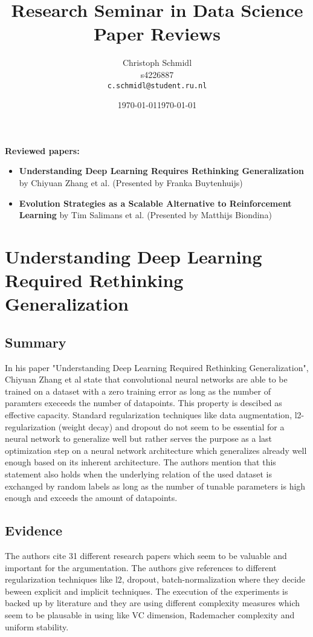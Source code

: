 \documentclass[a4paper]{article}
\title{Research Seminar in Data Science\\Paper Reviews}
\author{
  Christoph Schmidl\\ s4226887\\      \texttt{c.schmidl@student.ru.nl}
}
\date{\today}
\date{\today}
\begin{document}
\maketitle

\textbf{Reviewed papers:}

\begin{itemize}
	\item \textbf{Understanding Deep Learning Requires Rethinking Generalization} by Chiyuan Zhang et al. (Presented by Franka Buytenhuijs)
	\item \textbf{Evolution Strategies as a
Scalable Alternative to Reinforcement Learning} by Tim Salimans et al. (Presented by Matthijs Biondina)
\end{itemize}


\section{Understanding Deep Learning Required Rethinking Generalization}

\subsection{Summary}

In his paper "Understanding Deep Learning Required Rethinking Generalization", Chiyuan Zhang et al state that convolutional neural networks are able to be trained on a dataset with a zero training error as long as the number of paramters execeeds the number of datapoints. This property is descibed as effective capacity. Standard regularization techniques like data augmentation, l2-regularization (weight decay) and dropout do not seem to be essential for a neural network to generalize well but rather serves the purpose as a last optimization step on a neural network architecture which generalizes already well enough based on its inherent architecture. The authors mention that this statement also holds when the underlying relation of the used dataset is exchanged by random labels as long as the number of tunable parameters is high enough and exceeds the amount of datapoints.

\subsection{Evidence}

The authors cite 31 different research papers which seem to be valuable and important for the argumentation. The authors give references to different regularization techniques like l2, dropout, batch-normalization where they decide beween explicit and implicit techniques. The execution of the experiments is backed up by literature and they are using different complexity measures which seem to be plausable in using like VC dimension, Rademacher complexity and uniform stability.
\end{document}

